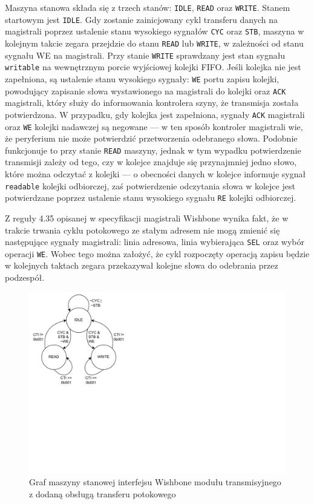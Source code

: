 Maszyna stanowa składa się z trzech stanów: \texttt{IDLE}, \texttt{READ} oraz \texttt{WRITE}.
Stanem startowym jest \texttt{IDLE}. Gdy zostanie zainicjowany cykl transferu danych na magistrali poprzez ustalenie stanu wysokiego sygnałów \texttt{CYC} oraz \texttt{STB}, maszyna w kolejnym takcie zegara przejdzie do stanu \texttt{READ} lub \texttt{WRITE}, w zależności od stanu sygnału WE na magistrali.
Przy stanie \texttt{WRITE} sprawdzany jest stan sygnału \texttt{writable} na wewnętrznym porcie wyjściowej kolejki FIFO. Jeśli kolejka nie jest zapełniona, są ustalenie stanu wysokiego sygnały: \texttt{WE} portu zapisu kolejki, powodujący zapisanie słowa wystawionego na magistrali do kolejki oraz \texttt{ACK} magistrali, który służy do informowania kontrolera szyny, że transmisja została potwierdzona. W przypadku, gdy kolejka jest zapełniona, sygnały \texttt{ACK} magistrali oraz \texttt{WE} kolejki nadawczej są negowane --- w ten sposób kontroler magistrali wie, że peryferium nie może potwierdzić przetworzenia odebranego słowa.
Podobnie funkcjonuje to przy stanie \texttt{READ} maszyny, jednak w tym wypadku potwierdzenie transmisji zależy od tego, czy w kolejce znajduje się przynajmniej jedno słowo, które można odczytać z kolejki --- o obecności danych w kolejce informuje sygnał \texttt{readable} kolejki odbiorczej, zaś potwierdzenie odczytania słowa w kolejce jest potwierdzane poprzez ustalenie stanu wysokiego sygnału \texttt{RE} kolejki odbiorczej.

Z reguły 4.35 opisanej w specyfikacji magistrali Wishbone wynika fakt, że w trakcie trwania cyklu potokowego ze stałym adresem nie mogą zmienić się następujące sygnały magistrali: linia adresowa, linia wybierająca \texttt{SEL} oraz wybór operacji \texttt{WE}. Wobec tego można założyć, że cykl rozpoczęty operacją zapisu będzie w kolejnych taktach zegara przekazywał kolejne słowa do odebrania przez podzespół.

\begin{figure}[H]
    \centering
    \includegraphics[scale=1,trim={0 7cm 13cm 0.1cm},clip]{implementation/fifo-fsm-burst.pdf}
    \caption{Graf maszyny stanowej interfejsu Wishbone modułu transmisyjnego z dodaną obsługą transferu potokowego}
    \label{fig:fifo-fsm-burst}
\end{figure}

